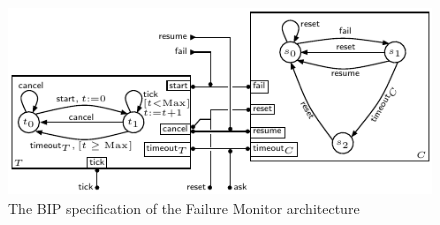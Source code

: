 \documentclass[smallcondensed]{svjour3}
\begin{document}
\begin{figure}[t]
  \centering
  \includegraphics[width=\columnwidth]{ActaXFIG/BIPspec-ArchFailureTimer-v2-2}
  \caption{The BIP specification of the Failure Monitor architecture}
  \label{schema:ArchFailure:BIP}
\end{figure}
\end{document}
